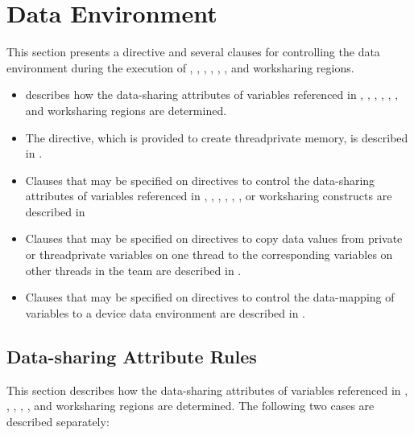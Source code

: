 \section{Data Environment}
\label{sec:Data Environment}
This section presents a directive and several clauses for controlling the data environment 
during the execution of , , , , , , and worksharing regions.

\begin{itemize}
\item {} 
describes how the data-sharing attributes of variables
referenced in , , , , , , and worksharing regions are determined.

\item The  directive, which is provided to create threadprivate memory, 
is described in .

\item Clauses that may be specified on directives to control the data-sharing attributes of 
variables referenced in , , , , , , or worksharing constructs are described in 

\item Clauses that may be specified on directives to copy data values from private or 
threadprivate variables on one thread to the corresponding variables on other threads 
in the team are described in .

\item Clauses that may be specified on directives to control the data-mapping of variables to a device data environment are described in .
\end{itemize}










\subsection{Data-sharing Attribute Rules}
\label{subsec:Data-sharing Attribute Rules}
This section describes how the data-sharing attributes of variables referenced in 
, , , , , and worksharing regions are determined. The following two cases are described separately:

